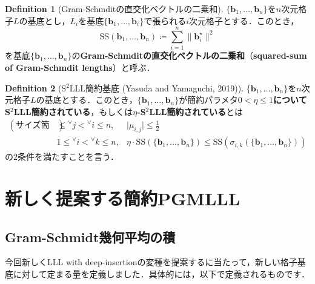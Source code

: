 \documentclass[a4j, dvipdfmx]{jsarticle}
\theoremstyle{definition}
\newtheorem{definition}{Definition}[section]
\begin{document}
\begin{definition}[Gram-Schmditの直交化ベクトルの二乗和]
$\{\boldsymbol{b}_1,\ldots,\boldsymbol{b}_n\}$を$n$次元格子$L$の基底とし，$L_i$を基底$\{\boldsymbol{b}_1,\ldots,\boldsymbol{b}_i\}$で張られる$i$次元格子とする．このとき，
$$
\mathrm{SS}(\boldsymbol{b}_1,\ldots,\boldsymbol{b}_n)\coloneqq \sum_{i=1}^n\lVert \boldsymbol{b}_i^\star\rVert^2
$$
を基底$\{\boldsymbol{b}_1,\ldots,\boldsymbol{b}_n\}$の\textbf{Gram-Schmditの直交化ベクトルの二乗和}（\textbf{squared-sum of Gram-Schmdit lengths}）と呼ぶ．
\end{definition}

\begin{definition}[S${\!}^2$LLL簡約基底 (Yasuda and Yamaguchi, 2019)]
$\{\boldsymbol{b}_1,\ldots,\boldsymbol{b}_n\}$を$n$次元格子$L$の基底とする．このとき，$\{\boldsymbol{b}_1,\ldots,\boldsymbol{b}_n\}$が簡約パラメタ\textbf{$0< \eta \le 1$についてS${\!}^2$LLL簡約されている}，もしくは\textbf{$\eta$-S${\!}^2$LLL簡約されている}とは
$$
\begin{array}{lll}
(\textbf{サイズ簡約条件})&\le{}^\forall j<{}^\forall i\le n,&\lvert\mu_{i, j}\rvert\le \frac{1}{2}\\
&1\le{}^\forall i<{}^\forall k\le n,&\eta\cdot \mathrm{SS}(\lbrace\boldsymbol{b}_1,\ldots,\boldsymbol{b}_n\rbrace)\le\mathrm{SS}(\sigma_{i, k}(\lbrace\boldsymbol{b}_1,\ldots,\boldsymbol{b}_n\rbrace))\end{array}
$$
の$2$条件を満たすことを言う．
\end{definition}

\section{新しく提案する簡約PGMLLL}

\subsection{Gram-Schmidt幾何平均の積}

今回新しくLLL with deep-insertionの変種を提案するに当たって，新しい格子基底に対して定まる量を定義しました．具体的には，以下で定義されるものです．
\end{document}
